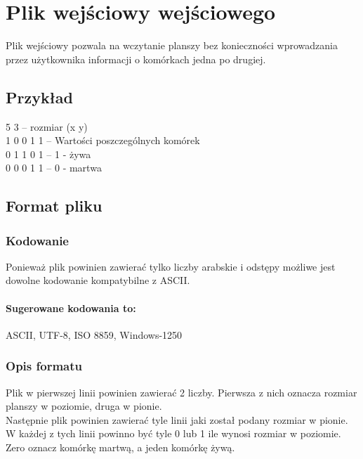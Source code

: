 \documentclass{report}
\begin{document}
\section{Plik wejściowy wejściowego}  \label{format}
Plik wejściowy pozwala na wczytanie planszy bez konieczności wprowadzania przez użytkownika informacji o komórkach jedna po drugiej.

\subsection{Przykład}
5 3 \tab -- rozmiar (x y) \\
1 0 0 1 1 \tab -- Wartości poszczególnych komórek \\
0 1 1 0 1 \tab -- 1 - żywa \\
0 0 0 1 1 \tab -- 0 - martwa \\

\subsection{Format pliku}
\subsubsection*{Kodowanie}
Ponieważ plik powinien zawierać tylko liczby arabskie i odstępy możliwe jest dowolne kodowanie kompatybilne z ASCII. \\
\paragraph{Sugerowane kodowania to:}
ASCII, UTF-8, ISO 8859, Windows-1250

\subsubsection*{Opis formatu}
Plik w pierwszej linii powinien zawierać 2 liczby. Pierwsza z nich oznacza rozmiar planszy w poziomie, druga w pionie. \\
Następnie plik powinien zawierać tyle linii jaki został podany rozmiar w pionie. W każdej z tych linii powinno być tyle 0 lub 1 ile wynosi rozmiar w poziomie. \\
Zero oznacz komórkę martwą, a jeden komórkę żywą.
\end{document}
